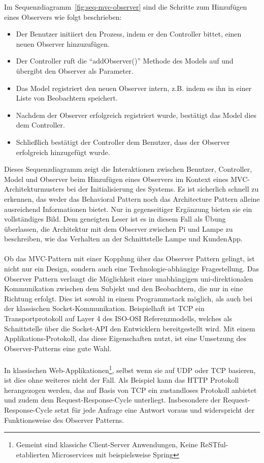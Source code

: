 Im Sequenzdiagramm~\ref{fig:seq-mvc-observer} sind die Schritte zum Hinzufügen eines Observers wie folgt beschrieben:
\begin{itemize}
\item Der Benutzer initiiert den Prozess, indem er den Controller bittet, einen neuen Observer hinzuzufügen.
\item Der Controller ruft die \enquote{addObserver()} Methode des Models auf und übergibt den Observer als Parameter.
\item Das Model registriert den neuen Observer intern, z.B. indem es ihn in einer Liste von Beobachtern speichert.
\item Nachdem der Observer erfolgreich registriert wurde, bestätigt das Model dies dem Controller.
\item Schließlich bestätigt der Controller dem Benutzer, dass der Observer erfolgreich hinzugefügt wurde.
\end{itemize}
Dieses Sequenzdiagramm zeigt die Interaktionen zwischen Benutzer, Controller, Model und Observer beim Hinzufügen eines Observers im Kontext eines MVC-Architekturmusters bei der Initialisierung des Systems. Es ist sicherlich schnell zu erkennen, das weder das Behavioral Pattern noch das Architecture Pattern alleine ausreichend Informationen bietet. Nur in gegenseitiger Ergänzung bieten sie ein vollständiges Bild. Dem geneigten Leser ist es in diesem Fall als Übung überlassen, die Architektur mit dem Observer zwischen Pi und Lampe zu beschreiben, wie das Verhalten an der Schnittstelle Lampe und KundenApp. 
\\\\
Ob das MVC-Pattern mit einer Kopplung über das Observer Pattern gelingt, ist nicht nur ein Design, sondern auch eine Technologie-abhängige Fragestellung. Das Observer Pattern verlangt die Möglichkeit einer unabhängigen uni-direktionalen Kommunikation zwischen dem Subjekt und den Beobachtern, die nur in eine Richtung erfolgt. Dies ist sowohl in einem Programmstack möglich, als auch bei der klassischen Socket-Kommunikation. Beispielhaft ist TCP ein Transportprotokoll auf Layer 4 des ISO-OSI Referenzmodells, welches als Schnittstelle über die Socket-API den Entwicklern bereitgestellt wird. Mit einem Applikations-Protokoll, das diese Eigenschaften nutzt, ist eine Umsetzung des Observer-Patterns eine gute Wahl. 
\\\\
In klassischen Web-Applikationen\footnote{Gemeint sind klassiche Client-Server Anwendungen, Keine ReSTful-etablierten Microservices mit beispielsweise Spring}, selbst wenn sie auf UDP oder TCP basieren, ist dies ohne weiteres nicht der Fall. Als Beispiel kann das HTTP Protokoll herangezogen werden, das auf Basis von TCP ein zustandloses Protokoll anbietet und zudem dem Request-Response-Cycle unterliegt. Insbesondere der Request-Response-Cycle setzt für jede Anfrage eine Antwort voraus und widerspricht der Funktionsweise des Observer Patterns.

